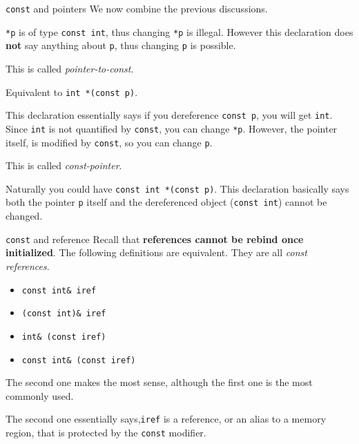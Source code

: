 \begin{frame}{\texttt{const} and pointers}
	We now combine the previous discussions. 
	
	\begin{description}
		\item[\texttt{const int *p}] \texttt{*p} is of type \texttt{const int}, thus changing \texttt{*p} is illegal. However this declaration does \textbf{not} say anything about \texttt{p}, thus changing \texttt{p} is possible. 
		
		This is called \textit{pointer-to-const}.
		
		\item[\texttt{int *const p}] Equivalent to \texttt{int *(const p)}.
		\item[\texttt{int *(const p)}] This declaration essentially says if you dereference \texttt{const p}, you will get \texttt{int}. Since \texttt{int} is not quantified by \texttt{const}, you can change \texttt{*p}. However, the pointer itself, is modified by \texttt{const}, so you can change \texttt{p}.
		
		This is called \textit{const-pointer}.
	\end{description}
	
	Naturally you could have \texttt{const int *(const p)}. This declaration basically says both the pointer \texttt{p} itself and the dereferenced object (\texttt{const int}) cannot be changed.
\end{frame}

\begin{frame}{\texttt{const} and reference}
Recall that \textbf{references cannot be rebind once initialized}. The following definitions are equivalent. They are all \textit{const references}.

\begin{itemize}
	\item \texttt{const int\& iref}
	\item \texttt{(const int)\& iref}
	\item \texttt{int\& (const iref)}
	\item \texttt{const int\& (const iref)}
\end{itemize}

The second one makes the most sense, although the first one is the most commonly used. 

The second one essentially says,\texttt{iref} is a reference, or an alias to a memory region, that is protected by the \texttt{const} modifier. 
\end{frame}

